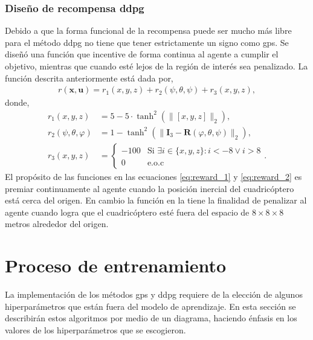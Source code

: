 \subsubsection{Diseño de recompensa \acrshort{ddpg}}
Debido a que la forma funcional de la recompensa puede ser mucho más libre para el método \acrshort{ddpg} no tiene que tener estrictamente un signo como \acrshort{gps}. Se diseñó una función que incentive de forma continua al agente a cumplir el objetivo, mientras que cuando esté lejos de la región de interés sea penalizado. La función descrita anteriormente está dada por,  
\begin{align}
r(\mathbf{x},\mathbf{u}) = r_1({x,y,z}) + r_2(\psi,\theta,\psi) + r_{3}(x, y, z),
\end{align}
donde,
\begin{align}
    r_1(x, y, z) &= 5 - 5 \cdot \tanh^2\left(\| [x, y, z] \|_2\right), \label{eq:reward_1}\\ 
    r_2(\psi, \theta, \varphi) &= 1 - \tanh^2\left(\| \mathbf{I}_3 - \mathbf{R}(\varphi, \theta, \psi) \|_2 \right), \label{eq:reward_2}\\
    r_3(x, y, z) &= \begin{cases}  
-100 & \text{Si }\exists i \in \{x,y,z\} : i < -8 \lor i > 8 \\
0 & \text{e.o.c}
\end{cases}. \label{eq:reward_3}
\end{align}
El propósito de las funciones en las ecuaciones \ref{eq:reward_1} y \ref{eq:reward_2} es premiar continuamente al agente cuando la posición inercial del  cuadricóptero está cerca del origen. En cambio la función en la  tiene la finalidad de penalizar al agente cuando logra que el cuadricóptero esté fuera del espacio de $8\times8\times8$ metros alrededor del origen. 

\section{Proceso de entrenamiento}

La implementación de los métodos \acrshort{gps} y \acrshort{ddpg} requiere de la elección de algunos hiperparámetros que están fuera del modelo de aprendizaje. En esta sección se describirán estos algoritmos por medio de un diagrama, haciendo énfasis en los valores de los hiperparámetros que se escogieron. 

